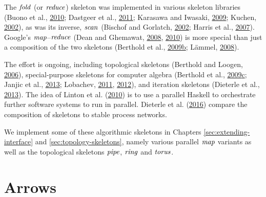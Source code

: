 \documentclass[paper=A4,twoside=true,openright,parskip=full,chapterprefix=true,headings=normal,bibliography=totoc,listof=totoc,titlepage=on,captions=tableabove,draft=false,british]{scrreprt}%
\begin{document}
The \ensuremath{\Varid{fold}} (or \ensuremath{\Varid{reduce}}) skeleton was implemented in various skeleton
libraries (Buono et al., \protect\hyperlink{ref-BUONO20102095}{2010};
Dastgeer et al.,
\protect\hyperlink{ref-Dastgeer:2011:ASM:1984693.1984697}{2011};
Karasawa and Iwasaki, \protect\hyperlink{ref-5361825}{2009}; Kuchen,
\protect\hyperlink{ref-Kuchen2002}{2002}), as was its inverse, \ensuremath{\Varid{scan}}
(Bischof and Gorlatch, \protect\hyperlink{ref-Bischof2002}{2002}; Harris
et al., \protect\hyperlink{ref-harris2007parallel}{2007}). Google's
\ensuremath{\Varid{map}}--\ensuremath{\Varid{reduce}} (Dean and Ghemawat,
\protect\hyperlink{ref-Dean:2008:MSD:1327452.1327492}{2008},
\protect\hyperlink{ref-Dean:2010:MFD:1629175.1629198}{2010}) is more
special than just a composition of the two skeletons (Berthold et al.,
\protect\hyperlink{ref-Berthold2009-mr}{2009}\protect\hyperlink{ref-Berthold2009-mr}{b};
Lämmel, \protect\hyperlink{ref-LAMMEL20081}{2008}).

The effort is ongoing, including topological skeletons (Berthold and
Loogen, \protect\hyperlink{ref-Eden:PARCO05}{2006}), special-purpose
skeletons for computer algebra (Berthold et al.,
\protect\hyperlink{ref-Berthold2009-fft}{2009}\protect\hyperlink{ref-Berthold2009-fft}{c};
Janjic et al., \protect\hyperlink{ref-janjic2013space}{2013}; Lobachev,
\protect\hyperlink{ref-lobachev-phd}{2011},
\protect\hyperlink{ref-Lobachev2012}{2012}), and iteration skeletons
(Dieterle et al., \protect\hyperlink{ref-Dieterle2013}{2013}). The idea
of Linton et al. (\protect\hyperlink{ref-scscp}{2010}) is to use a
parallel Haskell to orchestrate further software systems to run in
parallel. Dieterle et al.
(\protect\hyperlink{ref-dieterle_horstmeyer_loogen_berthold_2016}{2016})
compare the composition of skeletons to stable process networks.

We implement some of these algorithmic skeletons in Chapters
\ref{sec:extending-interface} and \ref{sec:topology-skeletons}, namely
various parallel \ensuremath{\Varid{map}} variants as well as the topological skeletons
\ensuremath{\Varid{pipe}}, \ensuremath{\Varid{ring}} and \ensuremath{\Varid{torus}}.

\hypertarget{arrows}{%
\section{Arrows}\label{arrows}}

\label{sec:relWorkArrows}
\end{document}
